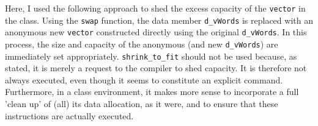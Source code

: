 Here, I used the following approach to shed the excess capacity of the \texttt{vector} in the class. Using the \texttt{swap} function, the data member \texttt{d\_vWords} is replaced with an anonymous new \texttt{vector} constructed directly using the original \texttt{d\_vWords}. In this process, the size and capacity of the anonymous (and new \texttt{d\_vWords}) are immediately set appropriately.
\texttt{shrink\_to\_fit} should not be used because, as stated, it is merely a request to the compiler to shed capacity. It is therefore not always executed, even though it seems to constitute an explicit command. Furthermore, in a class environment, it makes more sense to incorporate a full 'clean up' of (all) its data allocation, as it were, and to ensure that these instructions are actually executed.
